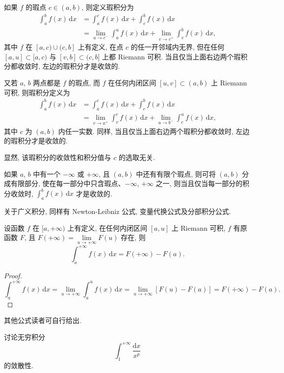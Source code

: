 如果 $f$ 的瑕点 $c\in(a,b)$, 则定义瑕积分为
\begin{align*}
\int_{a}^{b}f(x)\,\mathrm{d}x&=\int_{a}^{c}f(x)\,\mathrm{d}x+\int_{c}^{b}f(x)\,\mathrm{d}x\\
&=\lim_{u\to c^{-}}\int_{a}^{u}f(x)\,\mathrm{d}x+\lim_{v\to c^{+}}\int_{v}^{b}f(x)\,\mathrm{d}x,
\end{align*}
其中 $f$ 在 $[a,c)\cup(c,b]$ 上有定义, 在点 $c$ 的任一开邻域内无界, 但在任何 $[a,u]\subset[a,c)$ 与 $[v,b]\subset(c,b]$ 上都 Riemann 可积. 当且仅当上面右边两个瑕积分都收敛时, 左边的瑕积分才是收敛的.

又若 $a$, $b$ 两点都是 $f$ 的瑕点, 而 $f$ 在任何内闭区间 $[u,v]\subset(a,b)$ 上 Riemann 可积, 则瑕积分定义为
\begin{align*}
\int_{a}^{b}f(x)\,\mathrm{d}x&=\int_{a}^{c}f(x)\,\mathrm{d}x+\int_{c}^{b}f(x)\,\mathrm{d}x\\
&=\lim_{v\to a^{+}}\int_{v}^{c}f(x)\,\mathrm{d}x+\lim_{u\to b^{-}}\int_{c}^{u}f(x)\,\mathrm{d}x,
\end{align*}
其中 $c$ 为 $(a,b)$ 内任一实数. 同样, 当且仅当上面右边两个瑕积分都收敛时, 左边的瑕积分才是收敛的.

显然, 该瑕积分的收敛性和积分值与 $c$ 的选取无关.

如果 $a$, $b$ 中有一个 $-\infty$ 或 $+\infty$, 且 $(a,b)$ 中还有有限个瑕点, 则可将 $(a,b)$ 分成有限部分, 使在每一部分中只含瑕点、$-\infty$, $+\infty$ 之一, 则当且仅当每一部分的积分收敛时, $\int_{a}^{b}f(x)\,\mathrm{d}x$ 才是收敛的.

关于广义积分, 同样有 Newton-Leibniz 公式, 变量代换公式及分部积分公式.

\begin{theorem}\label{thm:6.5.1}
设函数 $f$ 在 $[a,+\infty)$ 上有定义, 在任何内闭区间 $[a,u]$ 上 Riemann 可积, $f$ 有原函数 $F$, 且 $F(+\infty)=\lim\limits_{u\to+\infty}F(u)$ 存在, 则
\[
\int_{a}^{+\infty}f(x)\,\mathrm{d}x=F(+\infty)-F(a).
\]
\end{theorem}

\begin{proof}
\[
\int_{a}^{+\infty}f(x)\,\mathrm{d}x=\lim_{u\to+\infty}\int_{a}^{u}f(x)\,\mathrm{d}x=\lim_{u\to+\infty}[F(u)-F(a)]=F(+\infty)-F(a).
\]
\end{proof}

其他公式读者可自行给出.

\begin{example}\label{ex:6.5.1}
讨论无穷积分
\[
\int_{1}^{+\infty}\frac{\mathrm{d}x}{x^{p}}
\]
的敛散性.
\end{example}

